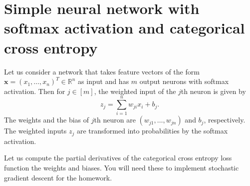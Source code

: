 \documentclass[12pt]{article}
\newcommand{\R}{\mathbb{R}}
\newcommand{\x}{\boldsymbol{x}}
\begin{document}
\section{Simple neural network with softmax activation and categorical cross entropy}

Let us consider a network that takes feature vectors of the form $\x=(x_1,\ldots,x_n)^T\in \R^n$ as input and has $m$ output neurons with softmax activation.  Then for $j\in[m]$, the weighted input of the $j$th neuron is given by
\begin{equation}
z_j = \sum_{i=1}^n w_{ji} x_i + b_j.
\end{equation}
The weights and the bias of $j$th neuron are $(w_{j1},\ldots,w_{jn})$ and $b_j$, respectively.  The weighted inputs $z_j$ are transformed into probabilities by the softmax activation.

\medskip
\noindent
Let us compute the partial derivatives of the categorical cross entropy loss function the weights and biases. You will need these to implement stochastic gradient descent for the homework.
\end{document}
